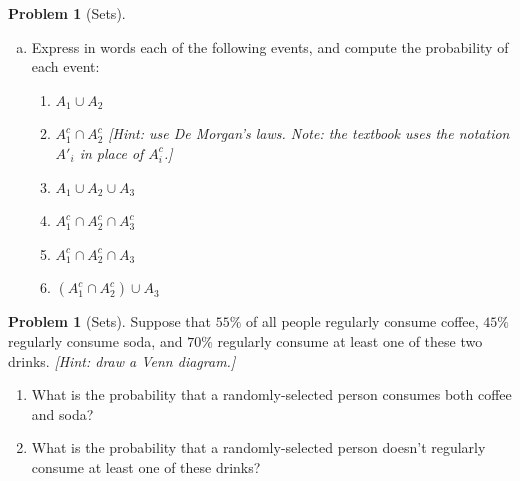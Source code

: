\documentclass[10pt]{article}
\theoremstyle{definition}
\newtheorem{problem}[theorem]{Problem}
\newcommand{\1}[1]{\textbf{1}_{\left[#1\right]}} %
\begin{document}
\begin{problem}[Sets]
\begin{enumerate}[(a)]
    \item Express in words each of the following events, and compute the probability of each event:
    \begin{enumerate}[(i.)]
      \item $A_{1}\cup A_{2} $
      \item $A_{1}^{c}\cap A_{2}^{c}$ \textit{[Hint: use De Morgan's laws.
        Note: the textbook uses the notation $A'_{i}$ in place of
        $A_{i}^{c}$.]}
      \item $A_{1}\cup A_{2}\cup A_{3}$
      \item $A_{1}^{c}\cap A_{2}^{c}\cap A_{3}^{c}$
      \item $A_{1}^{c}\cap A_{2}^{c}\cap A_{3} $
      \item $\left( A_{1}^{c}\cap A_{2}^{c} \right)\cup A_{3}$
    \end{enumerate}
  \end{enumerate}
\end{problem}

\begin{problem}[Sets]
  Suppose that $55\%$ of all people regularly consume coffee, $45\%$ regularly consume soda, and $70\%$
  regularly consume at least one of these two drinks. \textit{[Hint: draw a Venn diagram.]}
  \begin{enumerate}[(a.)]
    \item What is the probability that a randomly-selected person consumes both coffee and soda?
    \item What is the probability that a randomly-selected person doesn't regularly consume at least one
    of these drinks?
  \end{enumerate}
\end{problem}
\end{document}
